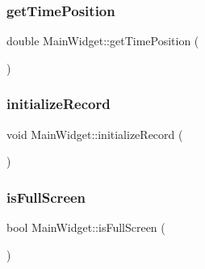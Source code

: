 \hypertarget{class_main_widget_a12f415557fac96812d8d8d502d1f214e}{}\label{class_main_widget_a12f415557fac96812d8d8d502d1f214e} 
\subsubsection{\texorpdfstring{get\+Time\+Position}{getTimePosition}}
{\footnotesize\ttfamily double Main\+Widget\+::get\+Time\+Position (\begin{DoxyParamCaption}{ }\end{DoxyParamCaption})\hspace{0.3cm}{\ttfamily [slot]}}

\hypertarget{class_main_widget_a0f23ec9b7d93ae56e59e5df3e05511d6}{}\label{class_main_widget_a0f23ec9b7d93ae56e59e5df3e05511d6} 
\subsubsection{\texorpdfstring{initialize\+Record}{initializeRecord}}
{\footnotesize\ttfamily void Main\+Widget\+::initialize\+Record (\begin{DoxyParamCaption}{ }\end{DoxyParamCaption})\hspace{0.3cm}{\ttfamily [slot]}}

\hypertarget{class_main_widget_a4f4031960df956ff84a49af1c6494366}{}\label{class_main_widget_a4f4031960df956ff84a49af1c6494366} 
\subsubsection{\texorpdfstring{is\+Full\+Screen}{isFullScreen}}
{\footnotesize\ttfamily bool Main\+Widget\+::is\+Full\+Screen (\begin{DoxyParamCaption}{ }\end{DoxyParamCaption})\hspace{0.3cm}{\ttfamily [slot]}}

\hypertarget{class_main_widget_a28eb2faaa16c15722645d73b2c178d8f}{}\label{class_main_widget_a28eb2faaa16c15722645d73b2c178d8f} 
